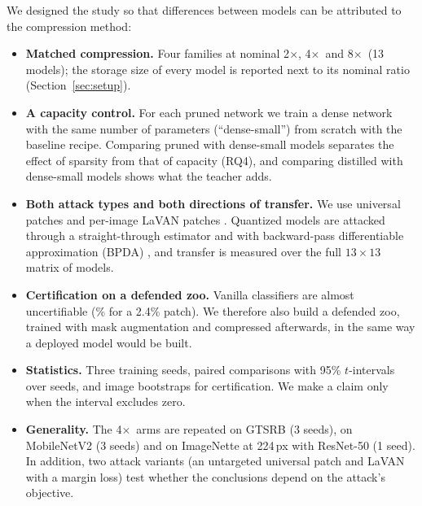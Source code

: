 \documentclass[10pt]{article}
\newcommand{\x}{$\times$}
\begin{document}
We designed the study so that differences between models can be attributed to the compression method:
\begin{itemize}
\item \textbf{Matched compression.} Four families at nominal 2\x, 4\x\ and 8\x\ (13 models); the storage size of every
model is reported next to its nominal ratio (Section~\ref{sec:setup}).
\item \textbf{A capacity control.} For each pruned network we train a dense network with the same number of parameters
(``dense-small'') from scratch with the baseline recipe. Comparing pruned with dense-small models separates the effect of
sparsity from that of capacity (RQ4), and comparing distilled with dense-small models shows what the teacher adds.
\item \textbf{Both attack types and both directions of transfer.} We use universal patches \citep{brown2017adversarial}
and per-image LaVAN patches \citep{karmon2018lavan}. Quantized models are attacked through a straight-through estimator
and with backward-pass differentiable approximation (BPDA) \citep{athalye2018obfuscated}, and transfer is measured over the
full $13\times 13$ matrix of models.
\item \textbf{Certification on a defended zoo.} Vanilla classifiers are almost uncertifiable
(\% for a 2.4\% patch). We therefore also build a defended zoo, trained with mask
augmentation and compressed afterwards, in the same way a deployed model would be built.
\item \textbf{Statistics.} Three training seeds, paired comparisons with 95\% $t$-intervals over seeds, and image
bootstraps for certification. We make a claim only when the interval excludes zero.
\item \textbf{Generality.} The 4\x\ arms are repeated on GTSRB \citep{stallkamp2012man} (3 seeds), on MobileNetV2
\citep{sandler2018mobilenetv2} (3 seeds) and on ImageNette at 224\,px with ResNet-50 (1 seed). In addition, two attack
variants (an untargeted universal patch and LaVAN with a margin loss) test whether the conclusions depend on the
attack's objective.
\end{itemize}
\end{document}

